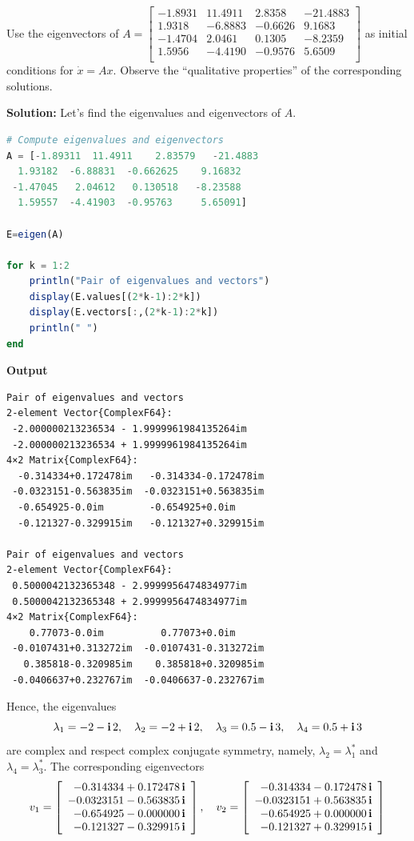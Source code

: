 \begin{example}
\label{ex:AnalyzeExpAt4Dimensional}
    Use the eigenvectors of $A=\left[
\begin{array}{cccc}
-1.8931 & 11.4911 & 2.8358 & -21.4883 \\
1.9318 & -6.8883 & -0.6626 & 9.1683 \\
-1.4704 & 2.0461 & 0.1305 & -8.2359 \\
1.5956 & -4.4190 & -0.9576 & 5.6509 \\
\end{array}
\right]$ as initial conditions for $\dot{x} = Ax.$ Observe the ``qualitative properties'' of the corresponding solutions. 
\end{example}
\textbf{Solution:}
Let's find the eigenvalues and eigenvectors of $A$.
\begin{lstlisting}[language=Julia,style=mystyle]
# Compute eigenvalues and eigenvectors
A = [-1.89311  11.4911    2.83579   -21.4883
  1.93182  -6.88831  -0.662625    9.16832
 -1.47045   2.04612   0.130518   -8.23588
  1.59557  -4.41903  -0.95763     5.65091]

E=eigen(A)

for k = 1:2
    println("Pair of eigenvalues and vectors")
    display(E.values[(2*k-1):2*k])
    display(E.vectors[:,(2*k-1):2*k])
    println(" ")
end
\end{lstlisting}
\textbf{Output} 
\begin{verbatim}
Pair of eigenvalues and vectors
2-element Vector{ComplexF64}:
 -2.000000213236534 - 1.9999961984135264im
 -2.000000213236534 + 1.9999961984135264im
4×2 Matrix{ComplexF64}:
  -0.314334+0.172478im   -0.314334-0.172478im
 -0.0323151-0.563835im  -0.0323151+0.563835im
  -0.654925-0.0im        -0.654925+0.0im
  -0.121327-0.329915im   -0.121327+0.329915im
 
Pair of eigenvalues and vectors
2-element Vector{ComplexF64}:
 0.5000042132365348 - 2.9999956474834977im
 0.5000042132365348 + 2.9999956474834977im
4×2 Matrix{ComplexF64}:
    0.77073-0.0im          0.77073+0.0im
 -0.0107431+0.313272im  -0.0107431-0.313272im
   0.385818-0.320985im    0.385818+0.320985im
 -0.0406637+0.232767im  -0.0406637-0.232767im
\end{verbatim}
Hence, the eigenvalues 
$$ \lambda_1 = -2-\mathop{\bm{\mathrm i}}2, \quad \lambda_2 =  -2 + \mathop{\bm{\mathrm i}}2, \quad \lambda_3 = 0.5-\mathop{\bm{\mathrm i}}3, \quad \lambda_4 =  0.5 + \mathop{\bm{\mathrm i}}3$$
are complex and respect complex conjugate symmetry, namely, $\lambda_2 = \lambda_1^\ast$ and $\lambda_4 = \lambda_3^\ast$. The corresponding eigenvectors  
$$v_1 = \left[
\begin{array}{r}
 -0.314334+0.172478 \mathop{\bm{\mathrm i}}  \\
 -0.0323151-0.563835 \mathop{\bm{\mathrm i}} \\
  -0.654925-0.000000 \mathop{\bm{\mathrm i}}      \\
  -0.121327-0.329915 \mathop{\bm{\mathrm i}}  
\end{array}
\right], \quad v_2 = 
\left[
\begin{array}{r}
  -0.314334-0.172478 \mathop{\bm{\mathrm i}}\\
 -0.0323151+0.563835 \mathop{\bm{\mathrm i}}\\
    -0.654925+0.000000 \mathop{\bm{\mathrm i}} \\
 -0.121327+0.329915 \mathop{\bm{\mathrm i}}
\end{array}
\right]
$$
